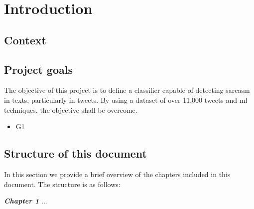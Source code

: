\chapter{Introduction}

\section{Context}



\section{Project goals}
The objective of this project is to define a classifier capable of detecting sarcasm in texts, particularly in tweets. By using a dataset of over 11,000 tweets and \ac{ml} techniques, the objective shall be overcome.


  
\begin{itemize}


\item  G1

\end{itemize}

\section{Structure of this document}
In this section we provide a brief overview of the chapters included in this document. The structure is as follows:

\textbf{\textit{Chapter 1}} ...